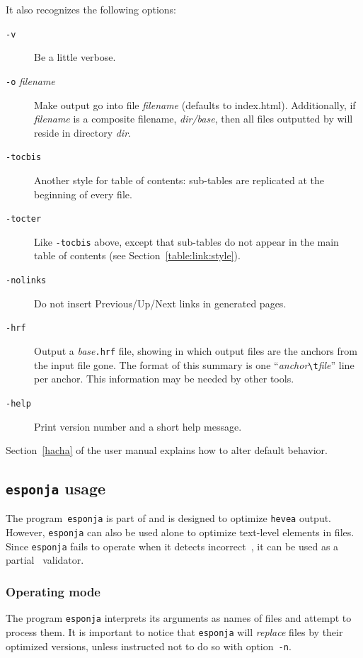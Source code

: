It also recognizes the following options:
\begin{description}
\item[{\tt -v}] Be a little verbose.
\item[{\tt -o} {\it filename}] Make \hacha{} output go into file
\textit{filename} (defaults  to index.html).
Additionally, if \textit{filename} is a composite filename,
\textit{dir/base}, then all files outputted by \hacha{} will
reside in directory \textit{dir}.
\item[{\tt -tocbis}]
Another style for table of contents:
sub-tables are replicated at the beginning of
every file.
\item[{\tt -tocter}]
Like \texttt{-tocbis} above, except that
sub-tables do not appear in the main table of contents
(see Section~\ref{table:link:style}).
\item[{\tt -nolinks}] Do not insert Previous/Up/Next links in
generated pages.
\item[{\tt -hrf}] Output a \textit{base}\texttt{.hrf} file, showing
in which output files are the anchors from the input file gone.
The format of this summary is one
``\textit{anchor}\verb+\t+\textit{file}'' line per anchor.
This information may be needed by other tools.
\item[{\tt -help}] Print version number and a short help message.
\end{description}

\noindent Section~\ref{hacha} of the user manual explains how to
alter \hacha{} default behavior.

\subsection{\texttt{esponja} usage}\label{esponjausage}
The program~\texttt{esponja}
is part of \hevea{} and is designed to optimize \texttt{hevea}
output.
However, \texttt{esponja} can also be used alone to optimize
text-level elements in \html{} files.
Since \texttt{esponja} fails
to operate when it detects incorrect~\html, it can be used as a
partial \html~validator.


\subsubsection{Operating mode}
The program \texttt{esponja} interprets its arguments as names of
files and attempt to process them.
It is important to notice that \texttt{esponja} will \emph{replace} files
by their optimized versions, unless instructed not to do so with
option~\texttt{-n}.

